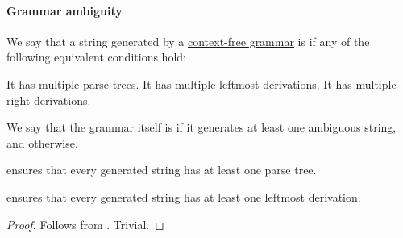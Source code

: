 \paragraph{Grammar ambiguity}

\begin{definition}\label{def:grammar_ambiguity}
  We say that a string generated by a \hyperref[def:chomsky_hierarchy/context_free]{context-free grammar} is  if any of the following equivalent conditions hold:
  \begin{thmenum}
     It has multiple \hyperref[def:parse_tree]{parse trees}.
     It has multiple \hyperref[def:leftmost_derivation]{leftmost derivations}.
     It has multiple \hyperref[def:leftmost_derivation]{right derivations}.
  \end{thmenum}

  We say that the grammar itself is  if it generates at least one ambiguous string, and  otherwise.
\end{definition}
\begin{comments}
  \item {} ensures that every generated string has at least one parse tree.
  \item {} ensures that every generated string has at least one leftmost derivation.
\end{comments}
\begin{proof}
   Follows from .
   Trivial.
\end{proof}

